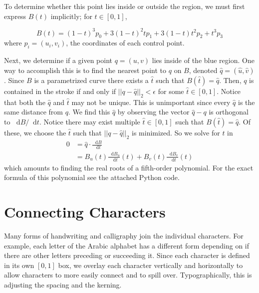 \documentclass[12pt]{article}
\newcommand*\diff{\mathop{}\!\mathrm{d}}
\begin{document}
To determine whether this point lies inside or outside the region, we must first express $B(t)$ implicitly; for $t \in [0,1]$,

\[
	B(t) = (1 - t)^3 p_0 + 3(1 - t)^2 t p_1 + 3(1 - t)t^2 p_2 + t^3 p_3
\]
where $p_i = (u_i, v_i)$, the coordinates of each control point.

Next, we determine if a given point $q = (u,v)$ lies inside of the blue region. One way to accomplish this is to find the nearest point to $q$ on $B$, denoted $\hat{q} = (\hat{u}, \hat{v})$. Since $B$ is a parametrized curve there exists a $\hat{t}$ such that $B(\hat{t}) = \hat{q}$. Then, $q$ is contained in the stroke if and only if $||q - \hat{q}||_2 < \epsilon$ for some $\hat{t} \in [0,1]$. Notice that both the $\hat{q}$ and $\hat{t}$ may not be unique. This is unimportant since every $\hat{q}$ is the same distance from $q$. We find this $\hat{q}$ by observing the vector $\hat{q} - q$ is orthogonal to $\diff B / \diff t$. Notice there may exist multiple $\hat{t} \in [0,1]$ such that $B(\hat{t}) = \hat{q}$. Of these, we choose the $\hat{t}$ such that $||q - \hat{q}||_2$ is minimized. So we solve for $t$ in
\begin{align*}
 0 &= \hat{q} \cdot \frac{\diff B}{\diff t} \\
  &= B_u(t)\frac{\diff B_u}{\diff t}(t) + B_v(t)\frac{\diff B_v}{\diff t}(t)
\end{align*}
which amounts to finding the real roots of a fifth-order polynomial. For the exact formula of this polynomial see the attached Python code.

\section{Connecting Characters}
Many forms of handwriting and calligraphy join the individual characters. For example, each letter of the Arabic alphabet has a different form depending on if there are other letters preceding or succeeding it. Since each character is defined in its own $[0,1]$ box, we overlay each character vertically and horizontally to allow characters to more easily connect and to spill over. Typographically, this is adjusting the spacing and the kerning. 
\end{document}
